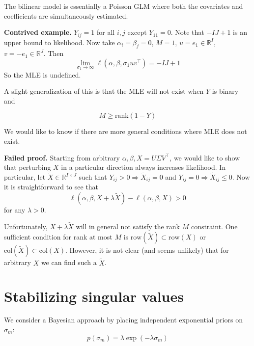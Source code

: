 \documentclass{article}
\newcommand{\R}{\mathbb{R}}
\begin{document}
The bilinear model is essentially a Poisson GLM where both the covariates and coefficients are simultaneously estimated. 

\medskip 

\textbf{Contrived example.} $Y_{ij} = 1$ for all $i,j$ except $Y_{11} = 0$. Note that $-IJ + 1$ is an upper bound to likelihood. Now take $\alpha_i = \beta_j = 0$, $M=1$, $u = e_1 \in \R^I$, $v = -e_1 \in \R^J$. Then 
\begin{equation}
\lim_{\sigma_1 \to \infty} \ell(\alpha, \beta, \sigma_1 uv^{\top}) = -IJ + 1
\end{equation}
So the MLE is undefined. 

\medskip 

A slight generalization of this is that the MLE will not exist when $Y$ is binary and 

\begin{equation}
M \geq \text{rank}(1 - Y)
\end{equation}

\medskip 

We would like to know if there are more general conditions where MLE does not exist. 

\medskip 

\textbf{Failed proof.} Starting from arbitrary $\alpha,\beta, X = U\Sigma V^{\top}$, we would like to show that perturbing $X$ in a particular direction always increases likelihood. In particular, let $\tilde{X} \in \R^{I \times J}$ such that $Y_{ij} > 0 \Rightarrow \tilde{X}_{ij} = 0$ and $Y_{ij} = 0 \Rightarrow \tilde{X}_{ij} \leq 0$. Now it is straightforward to see that 
\begin{equation}
\ell(\alpha, \beta, X + \lambda \tilde{X}) - \ell(\alpha, \beta, X) > 0
\end{equation}
for any $\lambda > 0$.

Unfortunately, $X + \lambda \tilde{X}$ will in general not satisfy the rank $M$ constraint. One sufficient condition for rank at most $M$ is $\text{row}(\tilde{X}) \subset \text{row}(X)$ or $\text{col}(\tilde{X}) \subset \text{col}(X)$. However, it is not clear (and seems unlikely) that for arbitrary $X$ we can find such a $\tilde{X}$. 

\section{Stabilizing singular values}

We consider a Bayesian approach by placing independent exponential priors on $\sigma_m$: 
\begin{equation}
p(\sigma_m) = \lambda \exp(-\lambda \sigma_m)
\end{equation}
\end{document}

